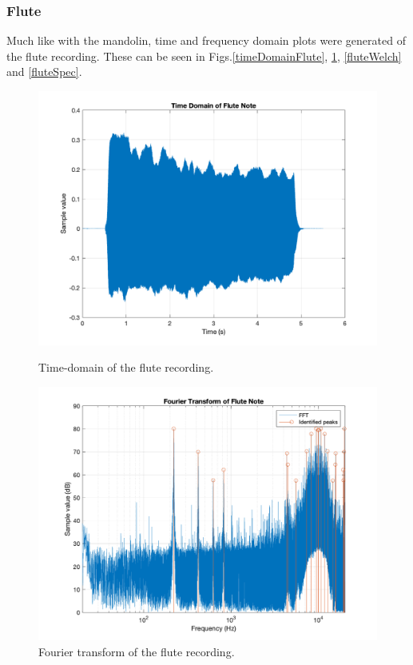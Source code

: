 \documentclass{article}
\begin{document}
        \subsubsection{Flute}
            Much like with the mandolin, time and frequency domain plots were generated of the flute recording.
            These can be seen in Figs.\ref{timeDomainFlute}, \ref{FFTFlute}, \ref{fluteWelch} and \ref{fluteSpec}.
            \begin{figure}[H]
                \centering
                \begin{minipage}{.49\textwidth}
                    \includegraphics[width=\linewidth]{images/timeDomainFlute.png}%
                    \centering
                    \caption{Time-domain of the flute recording.}
                    \label{timeDomainFlute}
                \end{minipage}
                \begin{minipage}{.49\textwidth}
                    \includegraphics[width=\linewidth]{images/FFTFlute.png}%
                    \centering
                    \caption{Fourier transform of the flute recording.}
                    \label{FFTFlute}
                \end{minipage}
            \end{figure}
\end{document}
